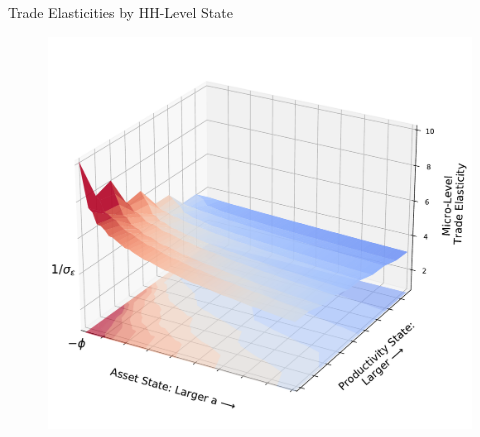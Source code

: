 \documentclass[9pt,pdftex,aspectratio=1610]{beamer}
\theoremstyle{definition}
\begin{document}


\begin{frame}[t]{Trade Elasticities by HH-Level State}
\vspace{-.5cm}
\begin{figure}[t]
\centerline{
\includegraphics[scale = 0.45]{../notes/figures/micro-elasticity.pdf}}
\end{figure}
\end{frame}

\end{document}

